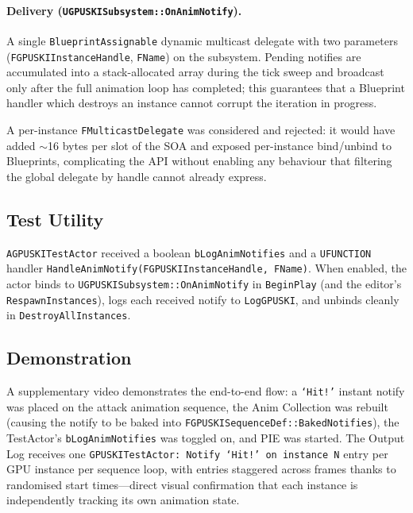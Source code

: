 \documentclass[11pt, a4paper]{article}
\begin{document}
\paragraph{Delivery (\texttt{UGPUSKISubsystem::OnAnimNotify}).}
A single \texttt{Blueprint\-Assignable} dynamic multicast delegate with two parameters (\texttt{FGPUSKIInstanceHandle}, \texttt{FName}) on the subsystem. Pending notifies are accumulated into a stack-allocated array during the tick sweep and broadcast only after the full animation loop has completed; this guarantees that a Blueprint handler which destroys an instance cannot corrupt the iteration in progress.

A per-instance \texttt{FMulticastDelegate} was considered and rejected: it would have added $\sim$16 bytes per slot of the SOA and exposed per-instance bind/unbind to Blueprints, complicating the API without enabling any behaviour that filtering the global delegate by handle cannot already express.

\subsection{Test Utility}

\texttt{AGPUSKITestActor} received a boolean \texttt{bLogAnimNotifies} and a \texttt{UFUNCTION} handler \texttt{HandleAnimNotify(FGPUSKIInstanceHandle, FName)}. When enabled, the actor binds to \texttt{UGPUSKISubsystem::OnAnimNotify} in \texttt{BeginPlay} (and the editor's \texttt{RespawnInstances}), logs each received notify to \texttt{LogGPUSKI}, and unbinds cleanly in \texttt{DestroyAllInstances}.

\subsection{Demonstration}

A supplementary video demonstrates the end-to-end flow: a \texttt{`Hit!'} instant notify was placed on the attack animation sequence, the Anim Collection was rebuilt (causing the notify to be baked into \texttt{FGPUSKISequenceDef::BakedNotifies}), the TestActor's \texttt{bLogAnimNotifies} was toggled on, and PIE was started. The Output Log receives one \texttt{GPUSKITestActor: Notify `Hit!' on instance N} entry per GPU instance per sequence loop, with entries staggered across frames thanks to randomised start times---direct visual confirmation that each instance is independently tracking its own animation state.

\end{document}

